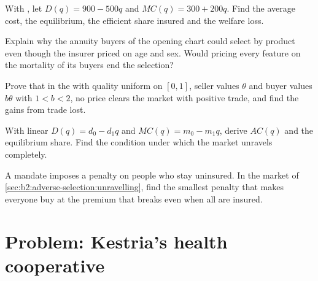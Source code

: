 \begin{exercise}[$\star\star$]\label{exo:b2:adverse-selection:8}
With , let $D(q) = 900 - 500q$ and $\mathit{MC}(q) = 300 + 200q$. Find the average cost, the equilibrium, the efficient
share insured and the welfare loss.
\end{exercise}

\begin{exercise}[$\star\star$]\label{exo:b2:adverse-selection:9}
Explain why the annuity buyers of the opening chart could select by product even though the insurer priced on age and sex.
Would pricing every feature on the mortality of its buyers end the selection?
\end{exercise}

\begin{exercise}[$\star\star\star$]\label{exo:b2:adverse-selection:10}
Prove that in the  with quality uniform on $[0, 1]$, seller values $\theta$ and buyer values $b\theta$ with $1 < b < 2$, no price
clears the market with positive trade, and find the gains from trade lost.
\end{exercise}

\begin{exercise}[$\star\star\star$]\label{exo:b2:adverse-selection:11}
With linear $D(q) = d_0 - d_1 q$ and $\mathit{MC}(q) = m_0 - m_1 q$, derive $\mathit{AC}(q)$ and the equilibrium share. Find the condition under which the
market unravels completely.
\end{exercise}

\begin{exercise}[$\star\star\star$]\label{exo:b2:adverse-selection:12}
A mandate imposes a penalty on people who stay uninsured. In the market of \cref{sec:b2:adverse-selection:unravelling}, find the
smallest penalty that makes everyone buy at the premium that breaks even when all are insured.
\end{exercise}

\section{Problem: Kestria's health cooperative}\label{sec:b2:adverse-selection:problem}

